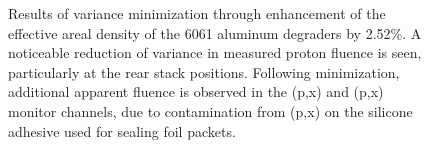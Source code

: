 \begin{figure}
    \centering
    \caption{Results of variance minimization through enhancement of the effective areal density of the 6061 aluminum degraders by 2.52\%. A noticeable reduction of variance in measured proton fluence is seen,  particularly at the  rear stack positions. Following minimization, additional apparent fluence is observed in the  (p,x) and (p,x) monitor channels, due to contamination from (p,x) on the silicone adhesive used for sealing foil packets.}
     \label{fig:variance_mins}
\end{figure}

